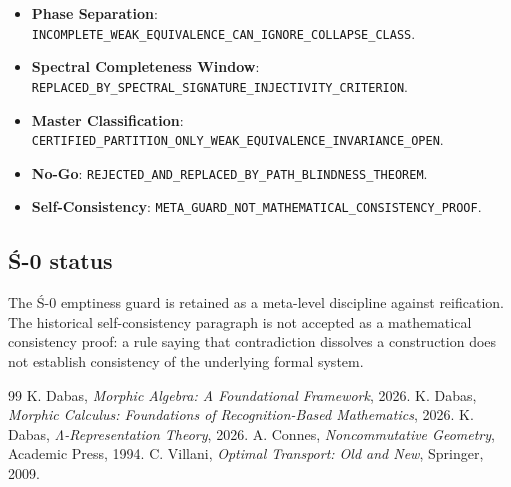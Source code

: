 \documentclass[12pt, oneside]{article}
\begin{document}
\begin{itemize}
\item \textbf{Phase Separation}: \texttt{INCOMPLETE\_WEAK\_EQUIVALENCE\_CAN\_IGNORE\_COLLAPSE\_CLASS}.
\item \textbf{Spectral Completeness Window}: \texttt{REPLACED\_BY\_SPECTRAL\_SIGNATURE\_INJECTIVITY\_CRITERION}.
\item \textbf{Master Classification}: \texttt{CERTIFIED\_PARTITION\_ONLY\_WEAK\_EQUIVALENCE\_INVARIANCE\_OPEN}.
\item \textbf{No-Go}: \texttt{REJECTED\_AND\_REPLACED\_BY\_PATH\_BLINDNESS\_THEOREM}.
\item \textbf{Self-Consistency}: \texttt{META\_GUARD\_NOT\_MATHEMATICAL\_CONSISTENCY\_PROOF}.
\end{itemize}
\subsection{Ś-0 status}
The Ś-0 emptiness guard is retained as a meta-level discipline against reification. The historical self-consistency paragraph is not accepted as a mathematical consistency proof: a rule saying that contradiction dissolves a construction does not establish consistency of the underlying formal system.

\begin{thebibliography}{99}
 K. Dabas, \emph{Morphic Algebra: A Foundational Framework}, 2026.
 K. Dabas, \emph{Morphic Calculus: Foundations of Recognition-Based Mathematics}, 2026.
 K. Dabas, \emph{Λ-Representation Theory}, 2026.
 A. Connes, \emph{Noncommutative Geometry}, Academic Press, 1994.
 C. Villani, \emph{Optimal Transport: Old and New}, Springer, 2009.
\end{thebibliography}
\end{document}
